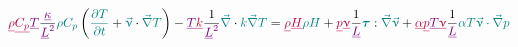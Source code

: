 \documentclass[a4paper,11pt]{article}
\begin{document}
\[
{\color{purple} \underline{\rho}} 
{\color{purple} \underline{C_p}} 
{\color{violet} \underline{T}}
\frac{ \color{violet} \underline{\kappa}  }{\color{violet} \underline{L}^2}
{\color{teal} \rho C_p}  
\left({\color{teal} \frac{\partial T}{\partial t} }
+{\color{teal} \vec\upnu} \cdot {\color{teal}\vec\nabla }{\color{teal} T}  
 \right)
- {\color{violet} \underline{T}} {\color{purple} \underline{k}} 
\frac{1}{\color{violet} \underline{L}^2}
{\color{teal}\vec\nabla } \cdot {\color{teal} k \vec\nabla T} 
= 
{\color{purple} \underline{\rho}} {\color{purple} \underline{H}}
{\color{teal} \rho} {\color{teal} H} 
+
{\color{purple} \underline{p}} {\color{purple} \underline{\upnu}} \frac{1}{\color{violet} \underline{L}}
{\color{teal} {\bm \tau}}: {\color{teal}\vec\nabla \vec\upnu   }
+
{\color{purple} \underline{\alpha}}
{\color{purple} \underline{p}}
{\color{violet} \underline{T}}
{\color{purple} \underline{\upnu}}
\frac{1}{\color{violet} \underline{L}}
{\color{teal} \alpha} 
{\color{teal} T} 
{\color{teal} \vec\upnu \cdot \vec\nabla  p} 
\]
\end{document}
